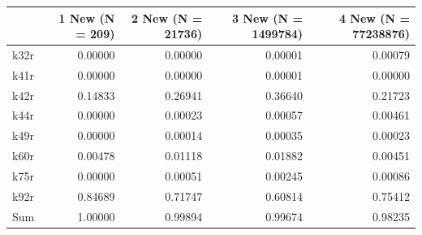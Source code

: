 \begin{tabular}{lrrrr}
\toprule
 & 1 New (N = 209) & 2 New (N = 21736) & 3 New (N = 1499784) & 4 New (N = 77238876) \\
\midrule
k32r & 0.00000 & 0.00000 & 0.00001 & 0.00079 \\
k41r & 0.00000 & 0.00000 & 0.00001 & 0.00000 \\
k42r & 0.14833 & 0.26941 & 0.36640 & 0.21723 \\
k44r & 0.00000 & 0.00023 & 0.00057 & 0.00461 \\
k49r & 0.00000 & 0.00014 & 0.00035 & 0.00023 \\
k60r & 0.00478 & 0.01118 & 0.01882 & 0.00451 \\
k75r & 0.00000 & 0.00051 & 0.00245 & 0.00086 \\
k92r & 0.84689 & 0.71747 & 0.60814 & 0.75412 \\
Sum & 1.00000 & 0.99894 & 0.99674 & 0.98235 \\
\bottomrule
\end{tabular}
